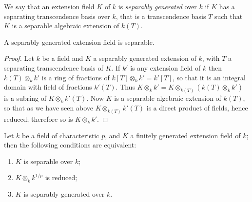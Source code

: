 We say that an extension field $K$ of $k$ is \emph{separably generated} over $k$ if $K$ has
a separating transcendence basis over $k$, that is a transcendence basis $T$ such
that $K$ is a separable algebraic extension of $k(T)$.

\begin{theorem}\label{thm:26.1}
A separably generated extension field is separable.
\end{theorem}

\begin{proof}
Let $k$ be a field and $K$ a separably generated extension of $k$, with $T$ a
separating transcendence basis of $K$. If $k'$ is any extension field of $k$ then
$k(T) \otimes_k k'$ is a ring of fractions of $k[T] \otimes_k k' = k'[T]$, so that it is an
integral domain with field of fractions $k'(T)$. Thus
$K \otimes_k k' = K \otimes_{k(T)} (k(T) \otimes_k k')$ is a subring of $K \otimes_k k'(T)$. Now
$K$ is a separable algebraic extension of $k(T)$, so that as we have seen above
$K \otimes_{k(T)} k'(T)$ is a direct product of fields, hence reduced; therefore so is
$K \otimes_k k'$.
\end{proof}

\begin{theorem}\label{thm:26.2}
Let $k$ be a field of characteristic $p$, and $K$ a finitely generated extension
field of $k$; then the following conditions are equivalent:
\begin{enumerate}[(1)]
  \item $K$ is separable over $k$;
  \item $K \otimes_k k^{1/p}$ is reduced;
  \item $K$ is separably generated over $k$.
\end{enumerate}
\end{theorem}

